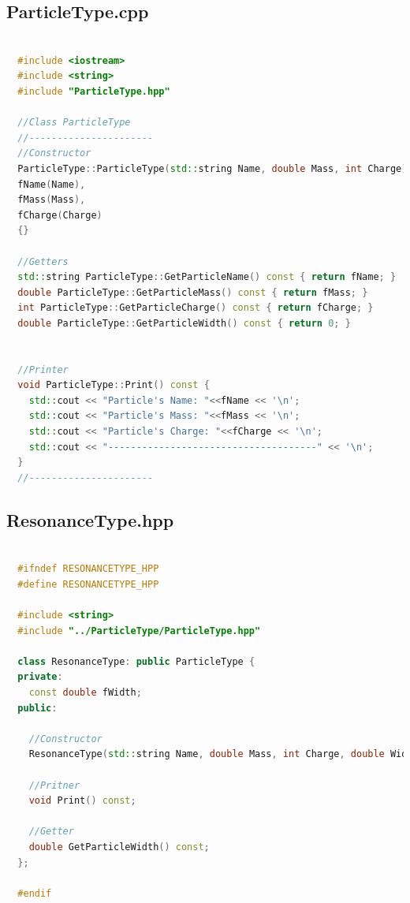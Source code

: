 \documentclass[a4paper, 11pt]{article}
\begin{document}
      \subsection{ParticleType.cpp}
        \begin{lstlisting}[language=c++, style=code]

  #include <iostream>
  #include <string>
  #include "ParticleType.hpp"

  //Class ParticleType
  //----------------------
  //Constructor
  ParticleType::ParticleType(std::string Name, double Mass, int Charge):
  fName(Name),
  fMass(Mass),
  fCharge(Charge)
  {}

  //Getters
  std::string ParticleType::GetParticleName() const { return fName; }
  double ParticleType::GetParticleMass() const { return fMass; }
  int ParticleType::GetParticleCharge() const { return fCharge; }
  double ParticleType::GetParticleWidth() const { return 0; }


  //Printer
  void ParticleType::Print() const {
    std::cout << "Particle's Name: "<<fName << '\n';
    std::cout << "Particle's Mass: "<<fMass << '\n';
    std::cout << "Particle's Charge: "<<fCharge << '\n';
    std::cout << "-------------------------------------" << '\n';
  }
  //----------------------
        \end{lstlisting}
      \subsection{ResonanceType.hpp}
        \begin{lstlisting}[language=c++, style=code]

  #ifndef RESONANCETYPE_HPP
  #define RESONANCETYPE_HPP

  #include <string>
  #include "../ParticleType/ParticleType.hpp"

  class ResonanceType: public ParticleType {
  private:
    const double fWidth;
  public:

    //Constructor
    ResonanceType(std::string Name, double Mass, int Charge, double Width);

    //Pritner
    void Print() const;

    //Getter
    double GetParticleWidth() const;
  };

  #endif
        \end{lstlisting}
\end{document}
